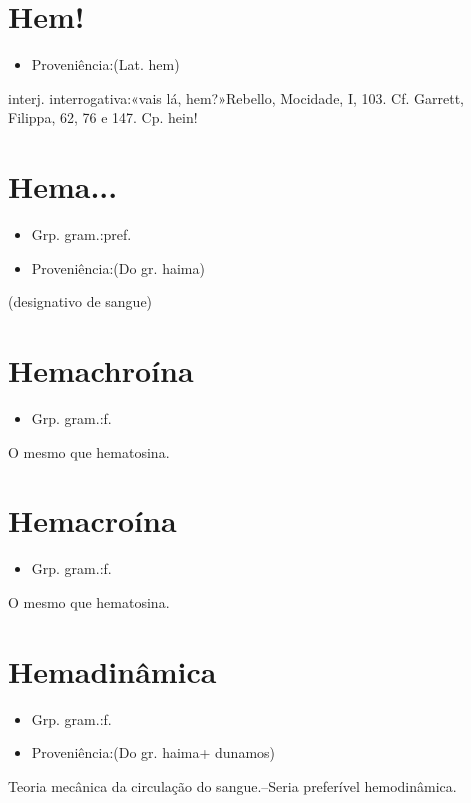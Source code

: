 \documentclass{article}
\begin{document}
\section{Hem!}
\begin{itemize}
\item {Proveniência:(Lat. \textunderscore hem\textunderscore )}
\end{itemize}
\textunderscore interj. interrogativa\textunderscore :«\textunderscore vais lá, hem?\textunderscore »Rebello, \textunderscore Mocidade\textunderscore , I, 103. Cf. Garrett, \textunderscore Filippa\textunderscore , 62, 76 e 147.
Cp. \textunderscore hein!\textunderscore 
\section{Hema...}
\begin{itemize}
\item {Grp. gram.:pref.}
\end{itemize}
\begin{itemize}
\item {Proveniência:(Do gr. \textunderscore haima\textunderscore )}
\end{itemize}
(designativo de \textunderscore sangue\textunderscore )
\section{Hemachroína}
\begin{itemize}
\item {Grp. gram.:f.}
\end{itemize}
O mesmo que \textunderscore hematosina\textunderscore .
\section{Hemacroína}
\begin{itemize}
\item {Grp. gram.:f.}
\end{itemize}
O mesmo que \textunderscore hematosina\textunderscore .
\section{Hemadinâmica}
\begin{itemize}
\item {Grp. gram.:f.}
\end{itemize}
\begin{itemize}
\item {Proveniência:(Do gr. \textunderscore haima\textunderscore  + \textunderscore dunamos\textunderscore )}
\end{itemize}
Teoria mecânica da circulação do sangue.--Seria preferível \textunderscore hemodinâmica\textunderscore .
\end{document}
